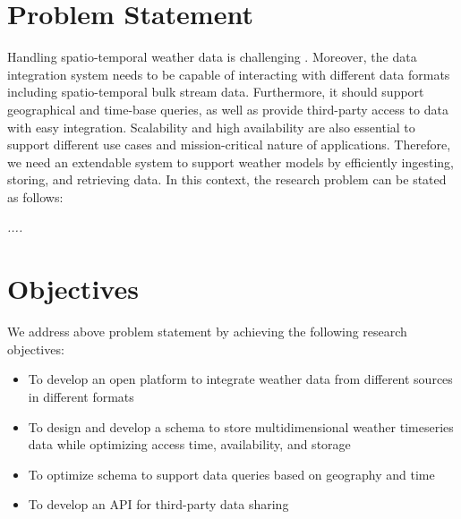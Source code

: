 \section{Problem Statement}
Handling spatio-temporal weather data is challenging . Moreover, the data integration system needs to be capable of interacting with different data formats including spatio-temporal bulk stream data. Furthermore, it should support geographical and time-base queries, as well as provide third-party access to data with easy integration. Scalability and high availability are also essential to support different use cases and mission-critical nature of applications. Therefore, we need an extendable system to support weather models by efficiently ingesting, storing, and retrieving data. In this context, the research problem can be stated as follows:
 
\emph{....}

\section{Objectives}
We address above problem statement by achieving the following research objectives:
\begin{itemize}
    \item To develop an open platform to integrate weather data from different sources in different formats
    \item To design and develop a schema to store multidimensional weather timeseries data while optimizing access time, availability, and storage
    \item To optimize schema to support data queries based on geography and time
    \item To develop an API for third-party data sharing
\end{itemize}

